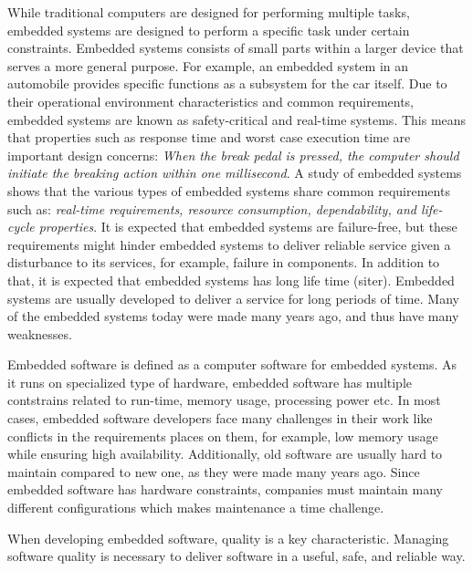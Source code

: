 While traditional computers are designed for performing multiple tasks, embedded systems are designed to perform a specific task under certain constraints. Embedded systems consists of small parts within a larger device that serves a more general purpose. For example, an embedded system in an automobile provides specific functions as a subsystem for the car itself\cite{Crnkovic:2005:CSE:1062455.1062631}. Due to their operational environment characteristics and common requirements, embedded systems are known as safety-critical and real-time systems\cite{563572,Crnkovic:2005:CSE:1062455.1062631}. This means that properties such as response time and worst case execution time are important design concerns\cite{4519555}: \textit{When the break pedal is pressed, the computer should initiate the breaking action within one millisecond}. A study of embedded systems shows that the various types of embedded systems share common requirements such as: \textit{real-time requirements, resource consumption, dependability, and life-cycle properties}\cite{crnkovic2004component}. It is expected that embedded systems are failure-free\cite{you2013reliability}, but these requirements might hinder embedded systems to deliver reliable service given a disturbance to its services, for example, failure in components\cite{patil2009embedded}. In addition to that, it is expected that embedded systems has long life time (siter). Embedded systems are usually developed to deliver a service for long periods of time. Many of the embedded systems today were made many years ago, and thus have many weaknesses. 

Embedded software is defined as a computer software for embedded systems\cite{radatz1990ieee}. As it runs on specialized type of hardware, embedded software has multiple contstrains related to run-time, memory usage, processing power etc. In most cases, embedded software developers face many challenges in their work like conflicts in the requirements places on them, for example, low memory usage while ensuring high availability\cite{vulgarakis2008embedded}. Additionally, old software are usually hard to maintain compared to new one, as they were made many years ago. Since embedded software has hardware constraints, companies must maintain many different configurations which makes maintenance a time challenge. 

When developing embedded software, quality is a key characteristic. Managing software quality is necessary to deliver software in a useful, safe, and reliable way\cite{563572}. 

